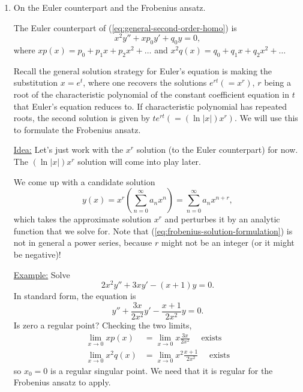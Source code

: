 \documentclass[11pt, letterpaper, oneside]{article}     %
\numberwithin{equation}{subsection}
\theoremstyle{definition}
\numberwithin{theorem}{section}
\theoremstyle{remark}
\begin{document}
\begin{enumerate}

\item On the Euler counterpart and the Frobenius ansatz.

  The Euler counterpart of (\ref{eq:general-second-order-homo}) is
  \begin{equation}
    x^2y'' + xp_0 y' + q_0y = 0,
  \end{equation}
  where $xp(x) = p_0 + p_1x + p_2x^2 + \dots$ and $x^2q(x) = q_0 + q_1x + q_2x^2 + \dots$

  Recall the general solution strategy for Euler's equation is making the substitution $x = e^t$, where one recovers the solutions $e^{rt} (= x^r)$, $r$ being a root of the characteristic polynomial of the constant coefficient equation in $t$ that Euler's equation reduces to. If characteristic polynomial has repeated roots, the second solution is given by $te^{rt} (= (\ln|x|)x^r)$. We will use this to formulate the Frobenius ansatz.

  \underline{Idea:} Let's just work with the $x^r$ solution (to the Euler counterpart) for now. The $(\ln|x|)x^r$ solution will come into play later.

  We come up with a candidate solution
  \begin{equation}\label{eq:frobenius-solution-formulation}
    y(x) = x^r\left(\sum_{n=0}^\infty a_nx^n\right)
    = \sum_{n=0}^\infty a_nx^{n+r},
  \end{equation}
  which takes the approximate solution $x^r$ and perturbes it by an analytic function that we solve for. Note that (\ref{eq:frobenius-solution-formulation}) is not in general a power series, because $r$ might not be an integer (or it might be negative)!

  \underline{Example:} Solve
  \begin{equation}\label{eq:example-frobenius-equation}
    2x^2y'' + 3xy' - (x+1)y = 0.
  \end{equation}
  In standard form, the equation is
  \begin{equation}
    y'' + \frac{3x}{2x^2}y' - \frac{x+1}{2x^2}y = 0.
  \end{equation}
  Is zero a regular point? Checking the two limits,
  \begin{align}
    \lim_{x\to0}xp(x) &= \lim_{x\to 0}x\frac{3x}{2x^2}\quad\text{ exists}\\
    \lim_{x\to0}x^2q(x) &= \lim_{x\to 0}x^2\frac{x+1}{2x^2}\quad\text{ exists}
  \end{align}
  so $x_0 = 0$ is a regular singular point. We need that it is regular for the Frobenius ansatz to apply.


\end{enumerate}
\end{document}
